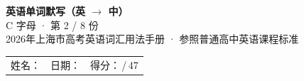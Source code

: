 \documentclass[10pt,a4paper]{article}
\begin{document}
\pagestyle{plain}

\begin{center}
{\LARGE\bfseries 英语单词默写（英 $\to$ 中）}\\[0.22em]
{\large C 字母 · 第 2 / 8 份}\\[0.18em]
{\small 2026年上海市高考英语词汇用法手册 · 参照普通高中英语课程标准}
\end{center}

\vspace{0.25em}
\noindent\begin{tabular}{@{}p{}@{}p{}@{}p{}@{}}
姓名：\underline{\hspace{2.0cm}} & 日期：\underline{\hspace{2.0cm}} & 得分：\underline{\hspace{1.3cm}}\,/\,47 \\
\end{tabular}

\vspace{0.3em}

\vspace{0.08em}
\end{document}
